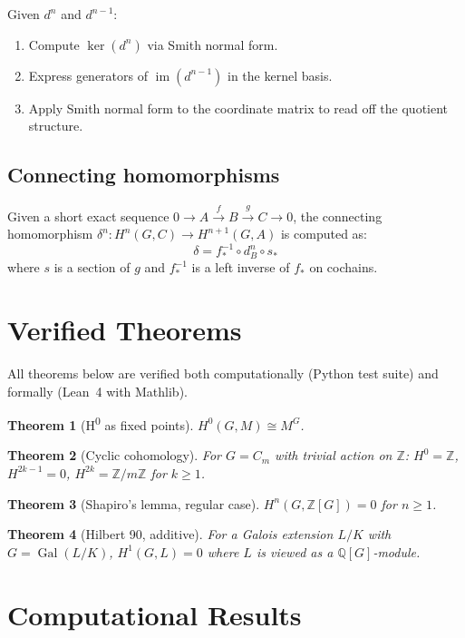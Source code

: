\documentclass[11pt,a4paper]{article}
\newtheorem{theorem}{Theorem}[section]
\theoremstyle{definition}
\theoremstyle{remark}
\DeclareMathOperator{\Gal}{Gal}
\DeclareMathOperator{\im}{im}
\begin{document}
Given $d^n$ and $d^{n-1}$:
\begin{enumerate}
  \item Compute $\ker(d^n)$ via Smith normal form.
  \item Express generators of $\im(d^{n-1})$ in the kernel basis.
  \item Apply Smith normal form to the coordinate matrix to read off
    the quotient structure.
\end{enumerate}

\subsection{Connecting homomorphisms}

Given a short exact sequence $0 \to A \xrightarrow{f} B \xrightarrow{g} C \to 0$,
the connecting homomorphism $\delta^n: H^n(G,C) \to H^{n+1}(G,A)$ is
computed as:
\[
  \delta = f^{-1}_* \circ d^n_B \circ s_*
\]
where $s$ is a section of $g$ and $f^{-1}_*$ is a left inverse of $f_*$
on cochains.

\section{Verified Theorems}\label{sec:verified}

All theorems below are verified both computationally (Python test suite)
and formally (Lean~4 with Mathlib).

\begin{theorem}[H\textsuperscript{0} as fixed points]
  $H^0(G, M) \cong M^G$.
\end{theorem}

\begin{theorem}[Cyclic cohomology]
  For $G = C_m$ with trivial action on $\mathbb{Z}$:
  $H^0 = \mathbb{Z}$, $H^{2k-1} = 0$, $H^{2k} = \mathbb{Z}/m\mathbb{Z}$
  for $k \geq 1$.
\end{theorem}

\begin{theorem}[Shapiro's lemma, regular case]
  $H^n(G, \mathbb{Z}[G]) = 0$ for $n \geq 1$.
\end{theorem}

\begin{theorem}[Hilbert 90, additive]
  For a Galois extension $L/K$ with $G = \Gal(L/K)$,
  $H^1(G, L) = 0$ where $L$ is viewed as a $\mathbb{Q}[G]$-module.
\end{theorem}

\section{Computational Results}\label{sec:results}
\end{document}
